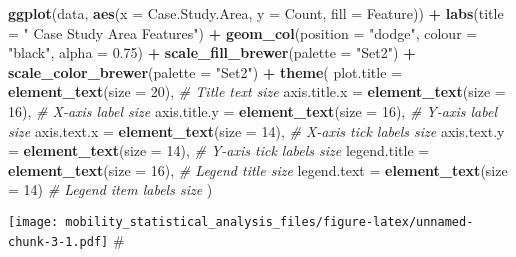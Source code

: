 \documentclass[
]{article}
\newenvironment{Shaded}{\begin{snugshade}}{\end{snugshade}}
\newcommand{\AttributeTok}[1]{\textcolor[rgb]{0.13,0.29,0.53}{#1}}
\newcommand{\CommentTok}[1]{\textcolor[rgb]{0.56,0.35,0.01}{\textit{#1}}}
\newcommand{\DecValTok}[1]{\textcolor[rgb]{0.00,0.00,0.81}{#1}}
\newcommand{\FloatTok}[1]{\textcolor[rgb]{0.00,0.00,0.81}{#1}}
\newcommand{\FunctionTok}[1]{\textcolor[rgb]{0.13,0.29,0.53}{\textbf{#1}}}
\newcommand{\NormalTok}[1]{#1}
\newcommand{\SpecialCharTok}[1]{\textcolor[rgb]{0.81,0.36,0.00}{\textbf{#1}}}
\newcommand{\StringTok}[1]{\textcolor[rgb]{0.31,0.60,0.02}{#1}}
\begin{document}
\begin{Shaded}
\begin{Highlighting}[]
\FunctionTok{ggplot}\NormalTok{(data, }\FunctionTok{aes}\NormalTok{(}\AttributeTok{x =}\NormalTok{ Case.Study.Area, }\AttributeTok{y =}\NormalTok{ Count, }\AttributeTok{fill =}\NormalTok{ Feature)) }\SpecialCharTok{+}
  \FunctionTok{labs}\NormalTok{(}\AttributeTok{title =} \StringTok{" Case Study Area Features"}\NormalTok{) }\SpecialCharTok{+}
  \FunctionTok{geom\_col}\NormalTok{(}\AttributeTok{position =} \StringTok{"dodge"}\NormalTok{, }\AttributeTok{colour =} \StringTok{"black"}\NormalTok{, }\AttributeTok{alpha =} \FloatTok{0.75}\NormalTok{) }\SpecialCharTok{+}
  \FunctionTok{scale\_fill\_brewer}\NormalTok{(}\AttributeTok{palette =} \StringTok{"Set2"}\NormalTok{) }\SpecialCharTok{+} 
  \FunctionTok{scale\_color\_brewer}\NormalTok{(}\AttributeTok{palette =} \StringTok{"Set2"}\NormalTok{) }\SpecialCharTok{+} 
  \FunctionTok{theme}\NormalTok{(}
  \AttributeTok{plot.title =} \FunctionTok{element\_text}\NormalTok{(}\AttributeTok{size =} \DecValTok{20}\NormalTok{),       }\CommentTok{\# Title text size}
  \AttributeTok{axis.title.x =} \FunctionTok{element\_text}\NormalTok{(}\AttributeTok{size =} \DecValTok{16}\NormalTok{),      }\CommentTok{\# X{-}axis label size}
  \AttributeTok{axis.title.y =} \FunctionTok{element\_text}\NormalTok{(}\AttributeTok{size =} \DecValTok{16}\NormalTok{),      }\CommentTok{\# Y{-}axis label size}
  \AttributeTok{axis.text.x =} \FunctionTok{element\_text}\NormalTok{(}\AttributeTok{size =} \DecValTok{14}\NormalTok{),       }\CommentTok{\# X{-}axis tick labels size}
  \AttributeTok{axis.text.y =} \FunctionTok{element\_text}\NormalTok{(}\AttributeTok{size =} \DecValTok{14}\NormalTok{),       }\CommentTok{\# Y{-}axis tick labels size}
  \AttributeTok{legend.title =} \FunctionTok{element\_text}\NormalTok{(}\AttributeTok{size =} \DecValTok{16}\NormalTok{),      }\CommentTok{\# Legend title size}
  \AttributeTok{legend.text =} \FunctionTok{element\_text}\NormalTok{(}\AttributeTok{size =} \DecValTok{14}\NormalTok{)        }\CommentTok{\# Legend item labels size}
\NormalTok{)}
\end{Highlighting}
\end{Shaded}

\texttt{[image: mobility\_statistical\_analysis\_files/figure-latex/unnamed-chunk-3-1.pdf]}
\#
\end{document}
